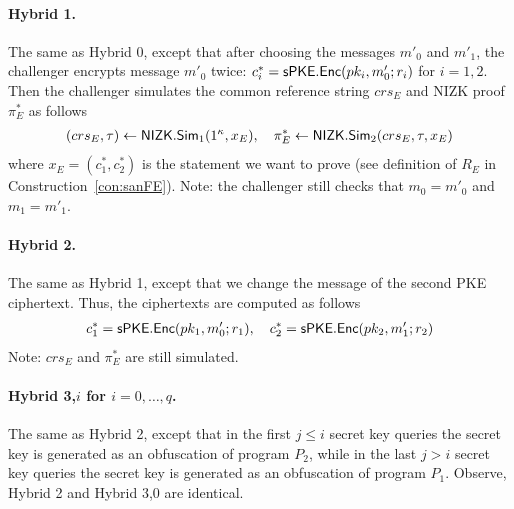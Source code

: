 \documentclass{llncs}
\begin{document}
\paragraph{Hybrid 1.} The same as Hybrid 0, except that after choosing the messages $m'_0$ and $m'_1$, the challenger encrypts message $m'_0$ twice: $c_i^* = \mathsf{sPKE}.\mathsf{Enc}(pk_i,m'_0;r_i)$ for $i=1,2$. Then the challenger simulates the common reference string $crs_E$ and NIZK proof $\pi_E^*$ as follows
	\begin{align*}
	(crs_E,\tau) \leftarrow \mathsf{NIZK}.\mathsf{Sim}_1(1^\kappa,x_E), \quad \pi_E^* \leftarrow \mathsf{NIZK}.\mathsf{Sim}_2(crs_E, \tau, x_E)
	\end{align*}
	where $x_E = (c_1^*,c_2^*)$ is the statement we want to prove (see definition of $R_E$ in Construction~\ref{con:sanFE}). Note: the challenger still checks that $m_0 = m'_0$ and $m_1 = m'_1$.

\paragraph{Hybrid 2.} The same as Hybrid 1, except that we change the message of the second PKE ciphertext. Thus, the ciphertexts are computed as follows
	\begin{align*}
	c_1^* = \mathsf{sPKE}.\mathsf{Enc}(pk_1,m'_0;r_1), \quad c_2^* = \mathsf{sPKE}.\mathsf{Enc}(pk_2,m'_1;r_2)
	\end{align*}
	Note: $crs_E$ and $\pi_E^*$ are still simulated.

\paragraph{Hybrid 3,$i$ for $i =0,\dots,q$.} The same as Hybrid 2, except that in the first $j \leq i$ secret key queries the secret key is generated as an obfuscation of program $P_2$, while in the last $j > i$ secret key queries the secret key is generated as an obfuscation of program $P_1$.
Observe, Hybrid 2 and Hybrid 3,0 are identical.
\end{document}

